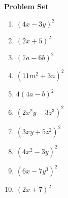 \textbf{Problem Set}

\vspce

\begin{enumerate} 
%

\item \hspce %
$ \left(4 x - 3 y\right)^{2}$

\item \hspce%
$ \left(2 x + 5\right)^{2}$

\item \hspce%
$ \left(7 a - 6 b\right)^{2}$

\item \hspce %
$\left(11 m^{2} + 3 n\right)^{2}$

\item \hspce %
$4 \left(4 a - b\right)^{2}$

\item \hspce %
$ \left(2 x^{2} y - 3 z^{3}\right)^{2}$

\item \hspce %
$ \left(3 x y + 5 z^{2}\right)^{2}$

\item \hspce%
$ \left(4 x^{2} - 3 y\right)^{2}$

\item \hspce %
$ \left(6 x - 7 y^{3}\right)^{2}$

\item \hspce %
$ \left(2 x + 7\right)^{2}$


% 
\end{enumerate}